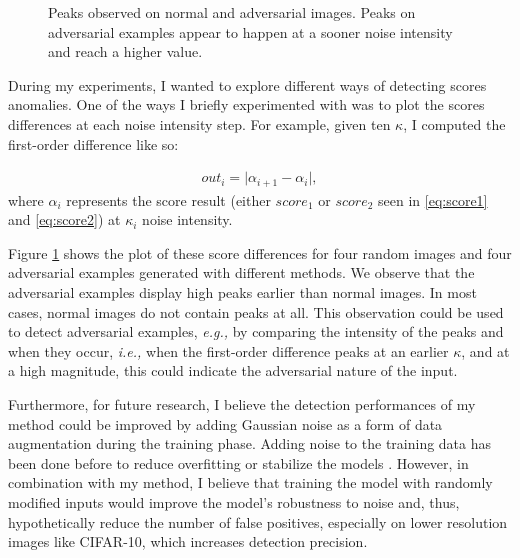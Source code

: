 \begin{figure}[!t]


    \caption{Peaks observed on normal and adversarial images. Peaks on
        adversarial examples appear to happen at a sooner noise intensity and
        reach a higher value.}
    \label{fig:peaks}
\end{figure}
During my experiments, I wanted to explore different ways of detecting scores
anomalies. One of the ways I briefly experimented with was to plot the scores
differences at each noise intensity step. For example, given ten $\kappa$, I
computed the first-order difference like so:

\begin{align}
    \label{eq:first-order-diff}
    out_i= \lvert \alpha_{i+1} - \alpha_{i} \rvert,
\end{align}
where $\alpha_i$ represents the score result (either $score_1$ or $score_2$ seen
in \ref{eq:score1} and \ref{eq:score2}) at $\kappa_i$ noise intensity.

Figure \ref{fig:peaks} shows the plot of these score differences for four random
images and four adversarial examples generated with different methods. We
observe that the adversarial examples display high peaks earlier than normal
images. In most cases, normal images do not contain peaks at all. This
observation could be used to detect adversarial examples, \emph{e.g.,} by
comparing the intensity of the peaks and when they occur, \emph{i.e.,} when the
first-order difference peaks at an earlier $\kappa$, and at a high magnitude,
this could indicate the adversarial nature of the input.

Furthermore, for future research, I believe the detection performances of my
method could be improved by adding Gaussian noise as a form of data augmentation
during the training phase. Adding noise to the training data has been done
before to reduce overfitting or stabilize the models
\cite{zheng_improving_2016}. However, in combination with my method, I believe
that training the model with randomly modified inputs would improve the model's
robustness to noise and, thus, hypothetically reduce the number of false
positives, especially on lower resolution images like CIFAR-10, which increases
detection precision.
